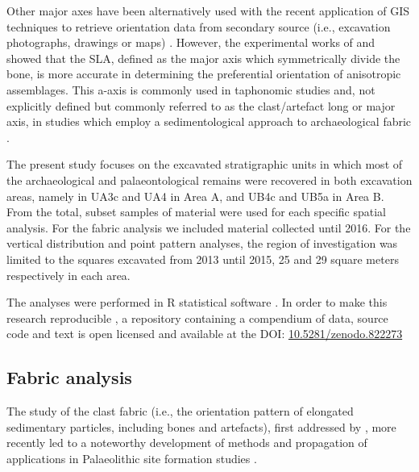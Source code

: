 \documentclass[preprint,authoryear,times]{elsarticle} %
\begin{document}
Other major axes have been alternatively used with the recent application of GIS techniques to retrieve orientation data from secondary source (i.e., excavation photographs, drawings or maps) \citep{Boschian2010,Benito-Calvo2011,Torre2013a,Walter2013,Garcia-Moreno2016,Sanchez-Romero2016}. %
However, the experimental works of \cite{Dominguez-Rodrigo2013} and \cite{Dominguez-Rodrigo2014} showed that the SLA, defined as the major axis which symmetrically divide the bone, is more accurate in determining the preferential orientation of anisotropic assemblages. This a-axis is commonly used in taphonomic studies \citep[][among others]{Toots1965,Voorhies1969,Ebert2007,Dominguez-Rodrigo2012,Dominguez-Rodrigo2014c,Aramendi2017} and, not explicitly defined but commonly referred to as the clast/artefact long or major axis, in studies which employ a sedimentological approach to archaeological fabric \citep[][among others]{Bertran1995,Bertran1997,Lenoble2004,Benito-Calvo2009}.

The present study focuses on the excavated stratigraphic units in which most of the archaeological and palaeontological remains were recovered in both excavation areas, namely in UA3c and UA4 in Area A, and UB4c and UB5a in Area B. From the total, subset samples of material were used for each specific spatial analysis. For the fabric analysis we included material collected until 2016. For the vertical distribution and point pattern analyses, the region of investigation was limited to the squares excavated from 2013 until 2015, 25 and 29 square meters respectively in each area.

The analyses were performed in \textsf{R} statistical software \citep{RCoreTeam2016}. In order to make this research reproducible \citep{Marwick2017,Marwick2017a}, a repository containing a compendium of data, source code and text is open licensed and available at the DOI: \href{https://doi.org/10.5281/zenodo.822273}{10.5281/zenodo.822273}

\subsection{Fabric analysis}

The study of the clast fabric (i.e., the orientation pattern of elongated sedimentary particles, including bones and artefacts), first addressed by \cite{Voorhies1966,Isaac1967,Bar-Yosef1972,Schick1986}, more recently led to a noteworthy development of methods and propagation of applications in Palaeolithic site formation studies \citep[][among others]{Bertran1995,Bertran1997,Lenoble2004,Lenoble2008,McPherron2005,Benito-Calvo2009,Benito-Calvo2011a,Benito-Calvo2011,Bernatchez2010,Boschian2010,Dominguez-Rodrigo2012,Dominguez-Rodrigo2013,Dominguez-Rodrigo2014,Torre2013a,Walter2013,Garcia-Moreno2016,Sanchez-Romero2016}.
\end{document}

